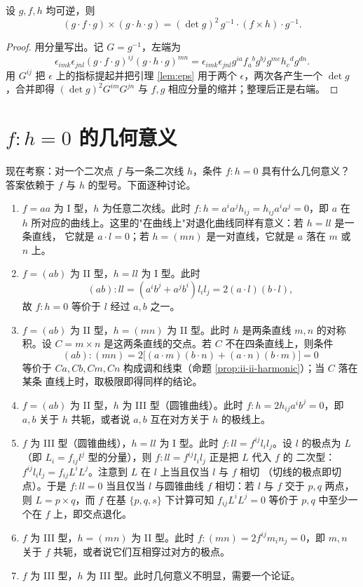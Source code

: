 \begin{proposition}[点线对偶]
\label{prop:dual}
设 $g,f,h$ 均可逆，则
\[
(g\cdot f\cdot g)\times(g\cdot h\cdot g)=(\det g)^2\,g^{-1}\cdot(f\times h)\cdot g^{-1}.
\]
\end{proposition}

\begin{proof}
用分量写出。记 $G=g^{-1}$，左端为
\[
\epsilon_{imk}\epsilon_{jnl}(g\cdot f\cdot g)^{ij}(g\cdot h\cdot g)^{mn}
=\epsilon_{imk}\epsilon_{jnl}g^{ia}f_a{}^b g^{bj}g^{mc}h_c{}^d g^{dn}.
\]
用 $G^{ij}$ 把 $\epsilon$ 上的指标提起并把引理 \ref{lem:eps} 用于两个 $\epsilon$，两次各产生一个
$\det g$，合并即得 $(\det g)^2G^{im}G^{jn}$ 与 $f,g$ 相应分量的缩并；整理后正是右端。
\end{proof}

\section{$f:h=0$ 的几何意义}

现在考察：对一个二次点 $f$ 与一条二次线 $h$，条件 $f:h=0$ 具有什么几何意义？答案依赖于 $f$ 与
$h$ 的型号。下面逐种讨论。

\begin{enumerate}[label=(\arabic*),leftmargin=2.2em]
  \item $f=aa$ 为 I 型，$h$ 为任意二次线。此时 $f:h=a^ia^jh_{ij}=h_{ij}a^ia^j=0$，即 $a$
        在 $h$ 所对应的曲线上。这里的"在曲线上"对退化曲线同样有意义：若 $h=ll$ 是一条直线，
        它就是 $a\cdot l=0$；若 $h=(mn)$ 是一对直线，它就是 $a$ 落在 $m$ 或 $n$ 上。
  \item $f=(ab)$ 为 II 型，$h=ll$ 为 I 型。此时
        \[
        (ab):ll=(a^ib^j+a^jb^i)l_il_j=2(a\cdot l)(b\cdot l),
        \]
        故 $f:h=0$ 等价于 $l$ 经过 $a,b$ 之一。
  \item $f=(ab)$ 为 II 型，$h=(mn)$ 为 II 型。此时 $h$ 是两条直线 $m,n$ 的对称积。设
        $C=m\times n$ 是这两条直线的交点。若 $C$ 不在四条直线上，则条件
        \[
        (ab):(mn)=2\big[(a\cdot m)(b\cdot n)+(a\cdot n)(b\cdot m)\big]=0
        \]
        等价于 $Ca,Cb,Cm,Cn$ 构成调和线束（命题 \ref{prop:ii-ii-harmonic}）；当 $C$ 落在某条
        直线上时，取极限即得同样的结论。
  \item $f=(ab)$ 为 II 型，$h$ 为 III 型（圆锥曲线）。此时 $f:h=2h_{ij}a^ib^j=0$，即
        $a,b$ 关于 $h$ 共轭，或者说 $a,b$ 互在对方关于 $h$ 的极线上。
  \item $f$ 为 III 型（圆锥曲线），$h=ll$ 为 I 型。此时 $f:ll=f^{ij}l_il_j$。设 $l$ 的极点为
        $L$（即 $L_i=f_{ij}l^j$ 型的分量），则 $f:ll=f^{ij}l_il_j$ 正是把 $L$ 代入 $f$ 的
        二次型：$f^{ij}l_il_j=f_{ij}L^iL^j$。注意到 $L$ 在 $l$ 上当且仅当 $l$ 与 $f$ 相切
        （切线的极点即切点）。于是 $f:ll=0$ 当且仅当 $l$ 与圆锥曲线 $f$ 相切：若 $l$ 与 $f$
        交于 $p,q$ 两点，则 $L=p\times q$，而 $f$ 在基 $\{p,q,s\}$ 下计算可知
        $f_{ij}L^iL^j=0$ 等价于 $p,q$ 中至少一个在 $f$ 上，即交点退化。
  \item $f$ 为 III 型，$h=(mn)$ 为 II 型。此时 $f:(mn)=2f^{ij}m_in_j=0$，即 $m,n$ 关于 $f$
        共轭，或者说它们互相穿过对方的极点。
  \item $f$ 为 III 型，$h$ 为 III 型。此时几何意义不明显，需要一个论证。
\end{enumerate}

